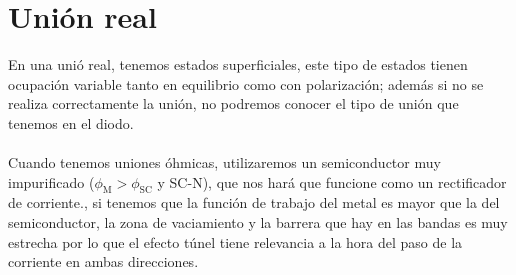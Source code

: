 \section{Unión real}
\noindent En una unió real, tenemos estados superficiales, este tipo de estados tienen ocupación variable tanto en equilibrio como con polarización; además si no se realiza correctamente la unión, no podremos conocer el tipo de unión que tenemos en el diodo.\\\\
Cuando tenemos uniones óhmicas, utilizaremos un semiconductor muy impurificado ($\phi_\mathrm{M}>\phi_\mathrm{SC}$ y SC-N), que nos hará que funcione como un rectificador de corriente., si tenemos que la función de trabajo del metal es mayor que la del semiconductor, la zona de vaciamiento y la barrera que hay en las bandas es muy estrecha por lo que el efecto túnel tiene relevancia a la hora del paso de la corriente en ambas direcciones.